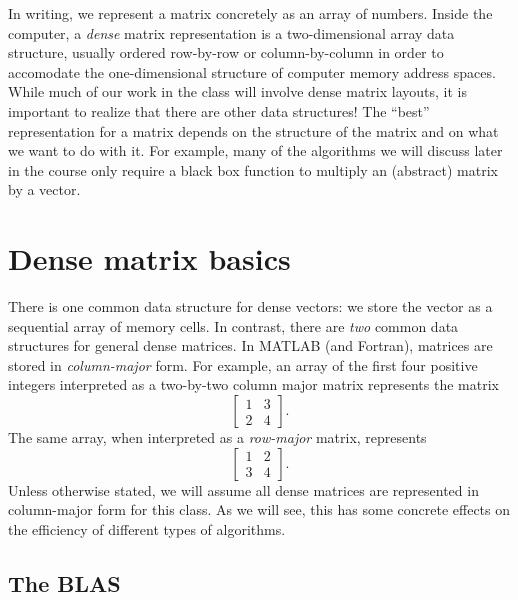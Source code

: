 \documentclass[12pt, leqno]{article} %
\begin{document}
In writing, we represent a matrix concretely as an array of numbers.
Inside the computer, a {\em dense} matrix representation is a
two-dimensional array data structure, usually ordered row-by-row or
column-by-column in order to accomodate the one-dimensional structure of
computer memory address spaces.  While much of our work in the class
will involve dense matrix layouts, it is important to realize that there
are other data structures!  The ``best'' representation for a matrix
depends on the structure of the matrix and on what we want to do with
it.  For example, many of the algorithms we will discuss later in the
course only require a black box function to multiply an (abstract)
matrix by a vector.


\section{Dense matrix basics}


There is one common data structure for dense vectors: we store
the vector as a sequential array of memory cells.  In contrast,
there are {\em two} common data structures for general dense matrices.
In MATLAB (and Fortran), matrices are stored in {\em column-major} form.
For example, an array of the first four positive integers interpreted
as a two-by-two column major matrix represents the matrix
\[
    \begin{bmatrix} 1 & 3 \\ 2 & 4 \end{bmatrix}.
\]
The same array, when interpreted as a {\em row-major} matrix, represents
\[
    \begin{bmatrix} 1 & 2 \\ 3 & 4 \end{bmatrix}.
\]
Unless otherwise stated, we will assume all dense matrices are represented
in column-major form for this class.  As we will see, this has some
concrete effects on the efficiency of different types of algorithms.

\subsection{The BLAS}
\end{document}

